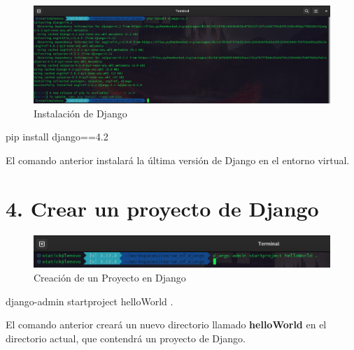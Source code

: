 \documentclass[
  a4paper,
  DIV=11,
  numbers=noendperiod,
  onepage,
  openany]{scrreprt}
\newenvironment{Shaded}{\begin{snugshade}}{\end{snugshade}}
\newcommand{\ExtensionTok}[1]{\textcolor[rgb]{0.00,0.23,0.31}{#1}}
\newcommand{\NormalTok}[1]{\textcolor[rgb]{0.00,0.23,0.31}{#1}}
\begin{document}
\begin{tcolorbox}
\begin{figure}[H]
{\centering \includegraphics{images/instalacion_django.png}

}

\caption{Instalación de Django}

\end{figure}%

\begin{Shaded}
\begin{Highlighting}[]
\ExtensionTok{pip}\NormalTok{ install django==4.2}
\end{Highlighting}
\end{Shaded}

El comando anterior instalará la última versión de Django en el entorno
virtual.

\section{4. Crear un proyecto de
Django}\label{crear-un-proyecto-de-django}

\begin{figure}[H]

{\centering \includegraphics{images/creacion_project_django.png}

}

\caption{Creación de un Proyecto en Django}

\end{figure}%

\begin{Shaded}
\begin{Highlighting}[]
\ExtensionTok{django{-}admin}\NormalTok{ startproject helloWorld .}
\end{Highlighting}
\end{Shaded}

El comando anterior creará un nuevo directorio llamado
\textbf{helloWorld} en el directorio actual, que contendrá un proyecto
de Django.


\end{tcolorbox}
\end{document}
